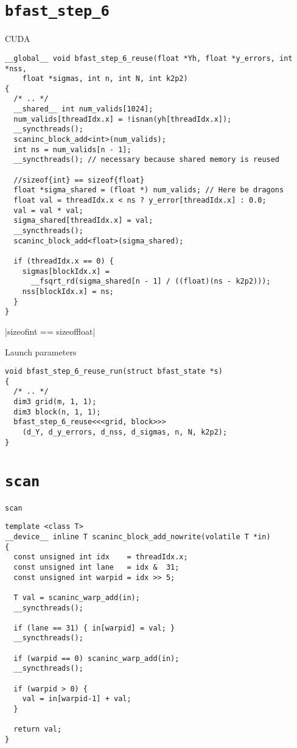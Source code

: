 \section{\texttt{bfast\_step\_6}} 

\begin{frame}[fragile]{CUDA}

\begin{verbatim}
__global__ void bfast_step_6_reuse(float *Yh, float *y_errors, int *nss,
    float *sigmas, int n, int N, int k2p2)
{
  /* .. */
  __shared__ int num_valids[1024];
  num_valids[threadIdx.x] = !isnan(yh[threadIdx.x]);
  __syncthreads();
  scaninc_block_add<int>(num_valids);
  int ns = num_valids[n - 1];
  __syncthreads(); // necessary because shared memory is reused

  //sizeof{int} == sizeof{float}
  float *sigma_shared = (float *) num_valids; // Here be dragons
  float val = threadIdx.x < ns ? y_error[threadIdx.x] : 0.0;
  val = val * val;
  sigma_shared[threadIdx.x] = val;
  __syncthreads();
  scaninc_block_add<float>(sigma_shared);

  if (threadIdx.x == 0) {
    sigmas[blockIdx.x] =
      __fsqrt_rd(sigma_shared[n - 1] / ((float)(ns - k2p2)));
    nss[blockIdx.x] = ns;
  }
}
\end{verbatim}
\pause
{}|sizeof{int} == sizeof{float}|

\end{frame}

\begin{frame}[fragile]{Launch parameters}
\begin{verbatim}
void bfast_step_6_reuse_run(struct bfast_state *s)
{
  /* .. */
  dim3 grid(m, 1, 1);
  dim3 block(n, 1, 1);
  bfast_step_6_reuse<<<grid, block>>>
    (d_Y, d_y_errors, d_nss, d_sigmas, n, N, k2p2);
}

\end{verbatim}
\end{frame}


\section{\texttt{scan}} 

\begin{frame}[fragile]{\texttt{scan}}
\begin{verbatim}
template <class T>
__device__ inline T scaninc_block_add_nowrite(volatile T *in)
{
  const unsigned int idx    = threadIdx.x;
  const unsigned int lane   = idx &  31;
  const unsigned int warpid = idx >> 5;

  T val = scaninc_warp_add(in);
  __syncthreads();

  if (lane == 31) { in[warpid] = val; }
  __syncthreads();

  if (warpid == 0) scaninc_warp_add(in);
  __syncthreads();

  if (warpid > 0) {
    val = in[warpid-1] + val;
  }

  return val;
}
\end{verbatim}
\end{frame}


